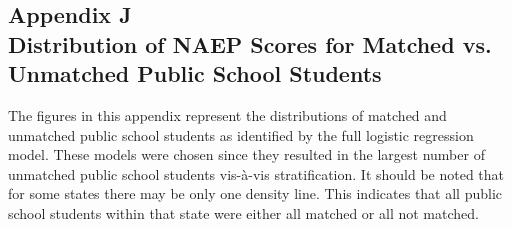 \documentclass[letterpaper,12p,twoside]{article} %
\begin{document}
\clearpage
{}
\subsection*{Appendix J\\Distribution of NAEP Scores for Matched vs. Unmatched Public School Students}
\label{appendixPublicDensity}

The figures in this appendix represent the distributions of matched and unmatched public school students as identified by the full logistic regression model. These models were chosen since they resulted in the largest number of unmatched public school students vis-\`a-vis stratification. It should be noted that for some states there may be only one density line. This indicates that all public school students within that state were either all matched or all not matched.

%
%
%
\end{document}
